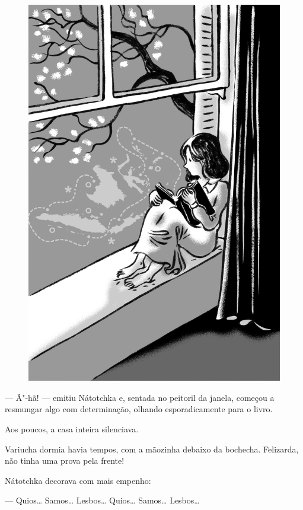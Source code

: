 \begin{figure}%
\vspace*{-2.1cm}
\hspace*{-2.2cm}\includegraphics{./imgs/cena12.jpg}
\end{figure}

--- Ã"-hã! --- emitiu Nátotchka e, sentada no peitoril da janela, começou
a resmungar algo com determinação, olhando esporadicamente para o livro.

Aos poucos, a casa inteira silenciava.

Variucha dormia havia tempos, com a mãozinha debaixo da bochecha.
Felizarda, não tinha uma prova pela frente!

Nátotchka decorava com mais empenho:

--- Quios\ldots{} Samos\ldots{} Lesbos\ldots{} Quios\ldots{} Samos\ldots{} Lesbos\ldots{}

